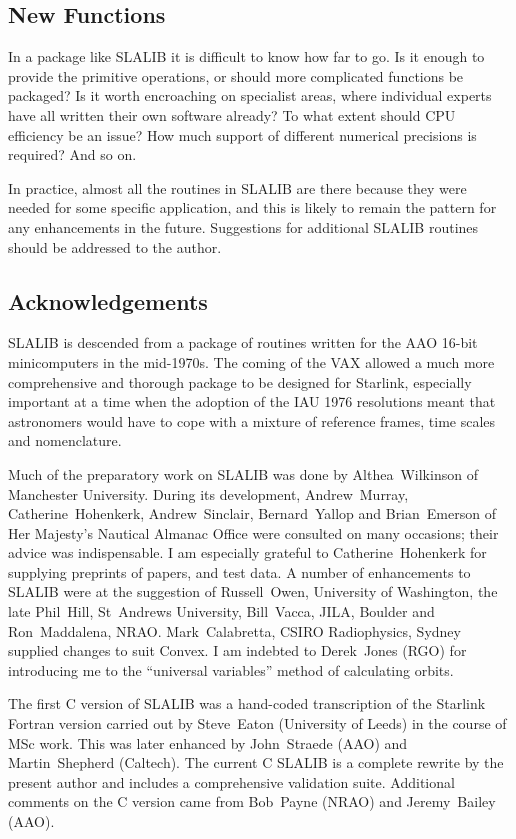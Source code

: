 \documentclass[11pt,twoside]{article}
\begin{document}
\subsection{New Functions}
In a package like SLALIB it is difficult to know how far to go.  Is it
enough to provide the primitive operations, or should more
complicated functions be packaged?  Is it worth encroaching on
specialist areas, where individual experts have all written their
own software already?  To what extent should CPU efficiency be
an issue?  How much support of different numerical precisions is
required?  And so on.

In practice, almost all the routines in SLALIB are there because they were
needed for some specific application, and this is likely to remain the
pattern for any enhancements in the future.
Suggestions for additional SLALIB routines should be addressed to the
author.

\subsection{Acknowledgements}
SLALIB is descended from a package of routines written
for the AAO 16-bit minicomputers
in the mid-1970s.  The coming of the VAX
allowed a much more comprehensive and thorough package
to be designed for Starlink, especially important
at a time when the adoption
of the IAU 1976 resolutions meant that astronomers
would have to cope with a mixture of reference frames,
time scales and nomenclature.

Much of the preparatory work on SLALIB was done by
Althea~Wilkinson of Manchester University.
During its development,
Andrew~Murray,
Catherine~Hohenkerk,
Andrew~Sinclair,
Bernard~Yallop
and
Brian~Emerson of Her Majesty's Nautical Almanac Office were consulted
on many occasions; their advice was indispensable.
I am especially grateful to
Catherine~Hohenkerk
for supplying preprints of papers, and test data. A number of
enhancements to SLALIB were at the suggestion of
Russell~Owen, University of Washington,
the late Phil~Hill, St~Andrews University,
Bill~Vacca, JILA, Boulder and
Ron~Maddalena, NRAO.
Mark~Calabretta, CSIRO Radiophysics, Sydney supplied changes to suit Convex.
I am indebted to Derek~Jones (RGO) for introducing me to the
``universal variables'' method of calculating orbits.

The first C version of SLALIB was a hand-coded transcription
of the Starlink Fortran version carried out by
Steve~Eaton (University of Leeds) in the course of
MSc work.  This was later
enhanced by John~Straede (AAO) and Martin~Shepherd (Caltech).
The current C SLALIB is a complete rewrite by the present author and
includes a comprehensive validation suite.
Additional comments on the C version came from Bob~Payne (NRAO) and
Jeremy~Bailey (AAO).
\end{document}
